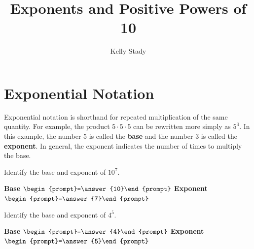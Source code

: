 \documentclass{ximera}
\title{Exponents and Positive Powers of 10}   %
\author{Kelly Stady}
\begin{document}
\begin{abstract}

\end{abstract}

\maketitle
\label{xim:ExponentsPowers10Activity}


\section*{Exponential Notation}

Exponential notation is shorthand for repeated multiplication of
the same quantity. For example, the product $5 \cdot 5 \cdot 5$ can be rewritten more simply
as $5^3.$  In this example, the number 5 is called the
\textbf{base} and the number 3 is called the \textbf{exponent}. In
general, the exponent indicates the number of times to multiply
the base.


\begin{problem} Identify the base and exponent of $10^7.$


\hspace{2in} \textbf{Base} $\begin{prompt}=\answer{10}\end{prompt}$  \hspace{1in}  \textbf{Exponent} $\begin{prompt}=\answer{7}\end{prompt}$

\end{problem}


\begin{problem} Identify the base and exponent of $4^5.$


\hspace{2in} \textbf{Base} $\begin{prompt}=\answer{4}\end{prompt}$  \hspace{1in}  \textbf{Exponent} $\begin{prompt}=\answer{5}\end{prompt}$

\end{problem}
\end{document}

